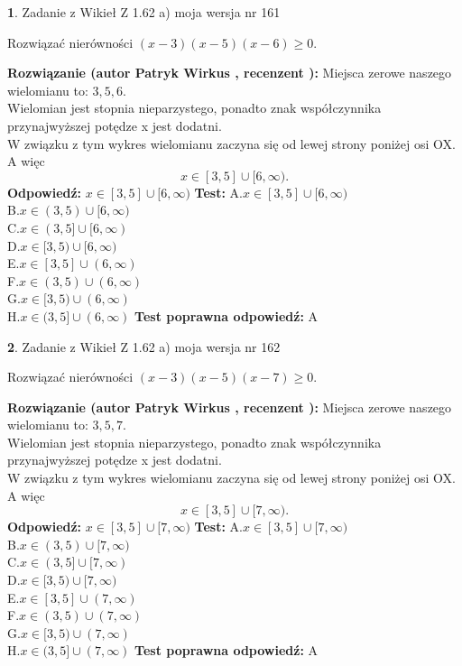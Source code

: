 \documentclass[12pt, a4paper]{article}
\theoremstyle{definition} %
\newtheorem{zad}{}
\newcommand{\zadStart}[1]{\begin{zad}#1\newline}
\newcommand{\zadStop}{\end{zad}}
\newcommand{\rozwStart}[2]{\noindent \textbf{Rozwiązanie (autor #1 , recenzent #2): }\newline}
\newcommand{\rozwStop}{\newline}
\newcommand{\odpStart}{\noindent \textbf{Odpowiedź:}\newline}
\newcommand{\odpStop}{\newline}
\newcommand{\testStart}{\noindent \textbf{Test:}\newline}
\newcommand{\testStop}{\newline}
\newcommand{\kluczStart}{\noindent \textbf{Test poprawna odpowiedź:}\newline}
\newcommand{\kluczStop}{\newline}
\begin{document}
\zadStart{Zadanie z Wikieł Z 1.62 a) moja wersja nr 161}

Rozwiązać nierówności $(x-3)(x-5)(x-6)\ge0$.
\zadStop
\rozwStart{Patryk Wirkus}{}
Miejsca zerowe naszego wielomianu to: $3, 5, 6$.\\
Wielomian jest stopnia nieparzystego, ponadto znak współczynnika przy\linebreak najwyższej potędze x jest dodatni.\\ W związku z tym wykres wielomianu zaczyna się od lewej strony poniżej osi OX. A więc $$x \in [3,5] \cup [6,\infty).$$
\rozwStop
\odpStart
$x \in [3,5] \cup [6,\infty)$
\odpStop
\testStart
A.$x \in [3,5] \cup [6,\infty)$\\
B.$x \in (3,5) \cup [6,\infty)$\\
C.$x \in (3,5] \cup [6,\infty)$\\
D.$x \in [3,5) \cup [6,\infty)$\\
E.$x \in [3,5] \cup (6,\infty)$\\
F.$x \in (3,5) \cup (6,\infty)$\\
G.$x \in [3,5) \cup (6,\infty)$\\
H.$x \in (3,5] \cup (6,\infty)$
\testStop
\kluczStart
A
\kluczStop



\zadStart{Zadanie z Wikieł Z 1.62 a) moja wersja nr 162}

Rozwiązać nierówności $(x-3)(x-5)(x-7)\ge0$.
\zadStop
\rozwStart{Patryk Wirkus}{}
Miejsca zerowe naszego wielomianu to: $3, 5, 7$.\\
Wielomian jest stopnia nieparzystego, ponadto znak współczynnika przy\linebreak najwyższej potędze x jest dodatni.\\ W związku z tym wykres wielomianu zaczyna się od lewej strony poniżej osi OX. A więc $$x \in [3,5] \cup [7,\infty).$$
\rozwStop
\odpStart
$x \in [3,5] \cup [7,\infty)$
\odpStop
\testStart
A.$x \in [3,5] \cup [7,\infty)$\\
B.$x \in (3,5) \cup [7,\infty)$\\
C.$x \in (3,5] \cup [7,\infty)$\\
D.$x \in [3,5) \cup [7,\infty)$\\
E.$x \in [3,5] \cup (7,\infty)$\\
F.$x \in (3,5) \cup (7,\infty)$\\
G.$x \in [3,5) \cup (7,\infty)$\\
H.$x \in (3,5] \cup (7,\infty)$
\testStop
\kluczStart
A
\kluczStop
\end{document}
